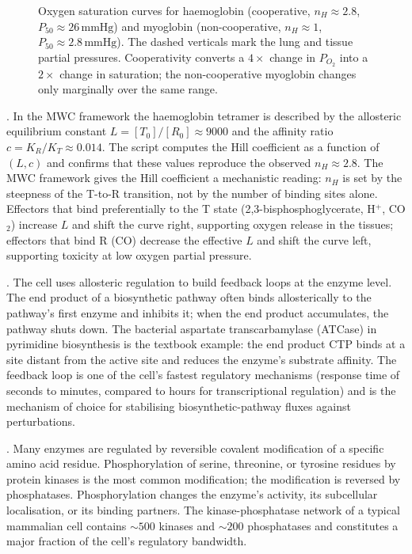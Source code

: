 \begin{figure}[ht]
\centering

\caption{Oxygen saturation curves for haemoglobin (cooperative,
$n_H \approx 2.8$, $P_{50} \approx 26\,\text{mmHg}$) and myoglobin
(non-cooperative, $n_H \approx 1$, $P_{50} \approx 2.8\,\text{mmHg}$).
The dashed verticals mark the lung and tissue partial pressures.
Cooperativity converts a $4\times$ change in $P_{O_2}$ into a
$2\times$ change in saturation; the non-cooperative myoglobin
changes only marginally over the same range.}
\label{fig:v6c04-hill}
\end{figure}

. In the MWC framework the
haemoglobin tetramer is described by the allosteric equilibrium
constant $L = [T_0]/[R_0] \approx 9000$ and the affinity ratio
$c = K_R / K_T \approx 0.014$. The script
 computes the Hill coefficient as a
function of $(L, c)$ and confirms that these values reproduce the
observed $n_H \approx 2.8$. The MWC framework gives the Hill
coefficient a mechanistic reading: $n_H$ is set by the steepness of
the T-to-R transition, not by the number of binding sites alone.
Effectors that bind preferentially to the T state (2,3-bisphosphoglycerate,
H$^+$, CO$_2$) increase $L$ and shift the curve right, supporting
oxygen release in the tissues; effectors that bind R (CO) decrease
the effective $L$ and shift the curve left, supporting toxicity at low
oxygen partial pressure.

. The cell uses allosteric regulation to
build feedback loops at the enzyme level. The end product of a
biosynthetic pathway often binds allosterically to the pathway's
first enzyme and inhibits it; when the end product accumulates, the
pathway shuts down. The bacterial aspartate transcarbamylase (ATCase)
in pyrimidine biosynthesis is the textbook example: the end product
CTP binds at a site distant from the active site and reduces the
enzyme's substrate affinity. The feedback loop is one of the cell's
fastest regulatory mechanisms (response time of seconds to minutes,
compared to hours for transcriptional regulation) and is the
mechanism of choice for stabilising biosynthetic-pathway fluxes
against perturbations.

. Many enzymes
are regulated by reversible covalent modification of a specific
amino acid residue. Phosphorylation of serine, threonine, or
tyrosine residues by protein kinases is the most common modification;
the modification is reversed by phosphatases. Phosphorylation
changes the enzyme's activity, its subcellular localisation, or its
binding partners. The kinase-phosphatase network of a typical
mammalian cell contains $\sim 500$ kinases and $\sim 200$
phosphatases and constitutes a major fraction of the cell's
regulatory bandwidth.

